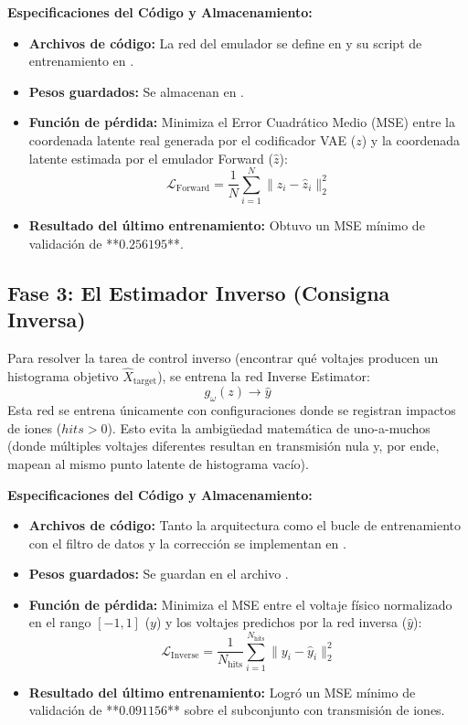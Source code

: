 \documentclass[12pt,letterpaper]{article}
\begin{document}
\textbf{Especificaciones del Código y Almacenamiento:}
\begin{itemize}
    \item \textbf{Archivos de código:} La red del emulador se define en  y su script de entrenamiento en .
    \item \textbf{Pesos guardados:} Se almacenan en .
    \item \textbf{Función de pérdida:} Minimiza el Error Cuadrático Medio (MSE) entre la coordenada latente real generada por el codificador VAE ($z$) y la coordenada latente estimada por el emulador Forward ($\hat{z}$):
    \begin{equation}
        \mathcal{L}_{\text{Forward}} = \frac{1}{N} \sum_{i=1}^{N} \|z_i - \hat{z}_i\|_2^2
    \end{equation}
    \item \textbf{Resultado del último entrenamiento:} Obtuvo un MSE mínimo de validación de **$0.256195$**.
\end{itemize}

\subsection{Fase 3: El Estimador Inverso (Consigna Inversa)}
Para resolver la tarea de control inverso (encontrar qué voltajes producen un histograma objetivo $\hat{X}_{\text{target}}$), se entrena la red Inverse Estimator:
\begin{equation}
    g_\omega(z) \rightarrow \hat{y}
\end{equation}
Esta red se entrena únicamente con configuraciones donde se registran impactos de iones ($hits > 0$). Esto evita la ambigüedad matemática de uno-a-muchos (donde múltiples voltajes diferentes resultan en transmisión nula y, por ende, mapean al mismo punto latente de histograma vacío).

\textbf{Especificaciones del Código y Almacenamiento:}
\begin{itemize}
    \item \textbf{Archivos de código:} Tanto la arquitectura como el bucle de entrenamiento con el filtro de datos y la corrección  se implementan en .
    \item \textbf{Pesos guardados:} Se guardan en el archivo .
    \item \textbf{Función de pérdida:} Minimiza el MSE entre el voltaje físico normalizado en el rango $[-1, 1]$ ($y$) y los voltajes predichos por la red inversa ($\hat{y}$):
    \begin{equation}
        \mathcal{L}_{\text{Inverse}} = \frac{1}{N_{\text{hits}}} \sum_{i=1}^{N_{\text{hits}}} \|y_i - \hat{y}_i\|_2^2
    \end{equation}
    \item \textbf{Resultado del último entrenamiento:} Logró un MSE mínimo de validación de **$0.091156$** sobre el subconjunto con transmisión de iones.
\end{itemize}
\end{document}
